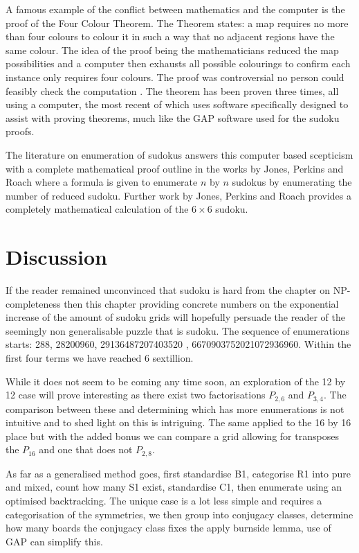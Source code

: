 \documentclass[a4paper,11pt]{report}
\newcounter{col}
\begin{document}
{A famous example of the conflict between mathematics and the computer is the proof of the Four Colour Theorem. The Theorem states: a map requires no more than four colours to colour it in such a way that no adjacent regions have the same colour. The idea of the proof being the mathematicians reduced the map possibilities and a computer then exhausts all possible colourings to confirm each instance only requires four colours. The proof was controversial no person could feasibly check the computation \cite{swart1980philosophical}. The theorem has been proven three times\cite{appel1989every}\cite{BarNatan1996LieAA}\cite{gonthier2008formal}, all using a computer, the most recent of which uses software specifically designed to assist with proving theorems, much like the GAP software used for the sudoku proofs. 

The literature on enumeration of sudokus answers this computer based scepticism with a complete mathematical proof outline in the works by Jones, Perkins and Roach \cite{mima2013number} where a formula is given to enumerate $n$ by $n$ sudokus by enumerating the number of reduced sudoku. Further work by Jones, Perkins and Roach \cite{jones2014number} provides a completely mathematical calculation of the $6\times6$ sudoku.

\section{Discussion}

If the reader remained unconvinced that sudoku is hard from the chapter on NP-completeness then this chapter providing concrete numbers on the exponential increase of the amount of sudoku grids will hopefully persuade the reader of the seemingly non generalisable puzzle that is sudoku. The sequence of enumerations starts: 288, 28200960, 29136487207403520 \cite{oeis_a291187} , 6670903752021072936960. Within the first four terms we have reached 6 sextillion. 

While it does not seem to be coming any time soon, an exploration of the 12 by 12 case will prove interesting as there exist two factorisations $P_{2,6}$ and $P_{3,4}$. The comparison between these and determining which has more enumerations is not intuitive and to shed light on this is intriguing. The same applied to the 16 by 16 place but with the added bonus we can compare a grid allowing for transposes the $P_{16}$ and one that does not $P_{2,8}$.

As far as a generalised method goes, first standardise B1, categorise R1 into pure and mixed, count how many S1 exist, standardise C1, then enumerate using an optimised backtracking. The unique case is a lot less simple and requires a categorisation of the symmetries, we then group into conjugacy classes, determine how many boards the conjugacy class fixes the apply burnside lemma, use of GAP can simplify this.

}
\end{document}
